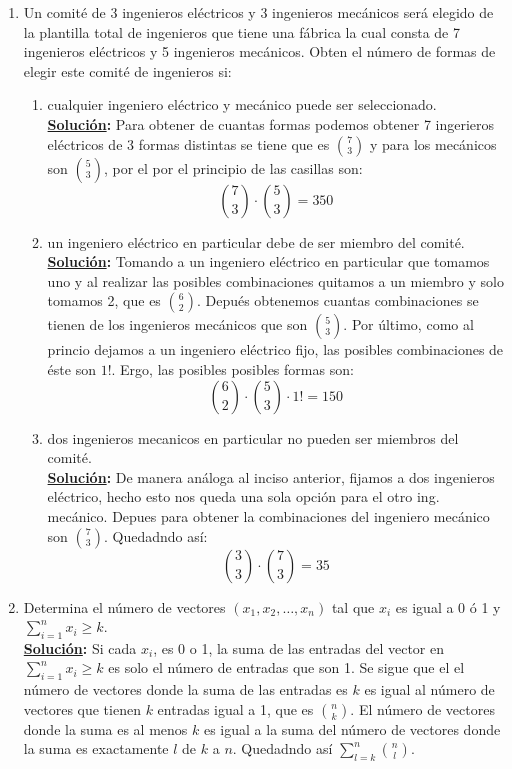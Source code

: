 \documentclass[11pt,letterpaper]{report}
\newcommand{\sol}{\textbf{\underline{Solución}: }} %
\begin{document}
\begin{enumerate}
\item Un comité de 3 ingenieros eléctricos y 3 ingenieros mecánicos será elegido de la plantilla
total de ingenieros que tiene una fábrica la cual consta de 7 ingenieros eléctricos y 5 ingenieros
mecánicos. Obten el número de formas de elegir este comité de ingenieros si:
\begin{enumerate}[label=\alph*)]
    \item cualquier ingeniero eléctrico y mecánico puede ser seleccionado.\\
    \sol Para obtener de cuantas formas podemos obtener 7 ingerieros eléctricos de 3 formas distintas
    se tiene que es $\binom{7}{3}$ y para los mecánicos son $\binom{5}{3}$, por el por el principio
    de las casillas son:
    $$\binom{7}{3} \cdot \binom{5}{3} = 350$$

    \item un ingeniero eléctrico en particular debe de ser miembro del comité.\\
    \sol Tomando a un ingeniero eléctrico en particular que tomamos uno y al realizar las
    posibles combinaciones quitamos a un miembro y solo tomamos 2, que es $\binom{6}{2}$.
    Depués obtenemos cuantas combinaciones se tienen de los ingenieros mecánicos que son
    $\binom{5}{3}$. Por último, como al princio dejamos a un ingeniero eléctrico fijo,
    las posibles combinaciones de éste son $1!$. Ergo, las posibles posibles formas son:
    $$\binom{6}{2} \cdot \binom{5}{3} \cdot 1! = 150$$

    \item dos ingenieros mecanicos en particular no pueden ser miembros del comité.\\
    \sol De manera análoga al inciso anterior, fijamos a dos ingenieros eléctrico, hecho esto
    nos queda una sola opción para el otro ing. mecánico. Depues para obtener la combinaciones
    del ingeniero mecánico son $\binom{7}{3}$. Quedadndo así:
    $$\binom{3}{3} \cdot \binom{7}{3} = 35$$
\end{enumerate}


\item Determina el número de vectores $(x_1,x_2,\ldots,x_n)$ tal que $x_i$ es igual a 0 ó 1
y $\sum_{i=1}^{n} x_i \geq k$.\\
\sol Si cada $x_i$, es 0 o 1, la suma de las entradas del vector en $\sum_{i=1}^{n} x_i \geq k$ es
solo el número de entradas que son 1. Se sigue que el el número de vectores donde la suma
de las entradas es $k$ es igual al número de vectores que tienen $k$ entradas igual a 1,
que es $\binom{n}{k}$. El número de vectores donde la suma es al menos $k$ es igual a la suma
del número de vectores donde la suma es exactamente $l$ de $k$ a $n$. Quedadndo así 
$\sum_{l=k}^{n} \binom{n}{l}$.


\end{enumerate}
\end{document}
